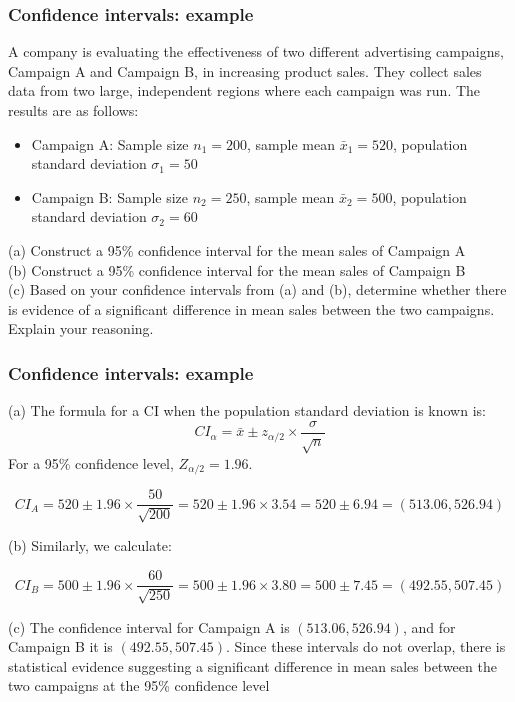 \documentclass[t,8pt]{beamer}%
\begin{document}
\begin{frame}
	\frametitle{Confidence intervals: example}
    A company is evaluating the effectiveness of two different advertising campaigns, Campaign A and Campaign B, in increasing product sales. They collect sales data from two large, independent regions where each campaign was run. The results are as follows:

\begin{itemize}
    \item Campaign A: Sample size $n_1 = 200$, sample mean $\bar{x}_1 = 520$, population standard deviation $\sigma_1 = 50$
    \item Campaign B: Sample size $n_2 = 250$, sample mean $\bar{x}_2 = 500$, population standard deviation $\sigma_2 = 60$
\end{itemize}

(a) Construct a 95\% confidence interval for the mean sales of Campaign A  \\
(b) Construct a 95\% confidence interval for the mean sales of Campaign B  \\
(c) Based on your confidence intervals from (a) and (b), determine whether there is evidence of a significant difference in mean sales between the two campaigns. Explain your reasoning.    
\end{frame}

\begin{frame}
	\frametitle{Confidence intervals: example}
    (a) The formula for a CI when the population standard deviation is known is:
\[
CI_{\alpha} = \bar{x} \pm z_{\alpha/2} \times \frac{\sigma}{\sqrt{n}}
\]
For a 95\% confidence level, $Z_{\alpha/2} = 1.96$.

\[
CI_A = 520 \pm 1.96 \times \frac{50}{\sqrt{200}} = 520 \pm 1.96 \times 3.54 = 520 \pm 6.94 = (513.06, 526.94)
\]

(b) Similarly, we calculate:

\[
CI_B = 500 \pm 1.96 \times \frac{60}{\sqrt{250}} = 500 \pm 1.96 \times 3.80 = 500 \pm 7.45 = (492.55, 507.45)
\]

(c) The confidence interval for Campaign A is $(513.06, 526.94)$, and for Campaign B it is $(492.55, 507.45)$. Since these intervals do not overlap, there is statistical evidence suggesting a significant difference in mean sales between the two campaigns at the 95\% confidence level
  
\end{frame}
\end{document}
